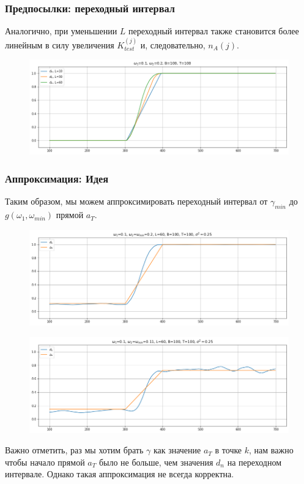 \documentclass[11pt]{beamer}
\begin{document}
	\begin{frame}
		\frametitle{Предпосылки: переходный интервал}
		Аналогично, при уменьшении $ L $ переходный интервал также становится более линейным в силу увеличения $ K_{test}^{(j)} $ и, следовательно, $ n_A(j) $.
		\begin{figure}[b]
			\centering
			\includegraphics[width=\linewidth]{imgs/row_linear_growth}
		\end{figure}
	\end{frame}
	
	\begin{frame}
		\frametitle{Аппроксимация: Идея}
		Таким образом, мы можем аппроксимировать переходный интервал от $ \gamma_{min} $ до $ g(\omega_1, \omega_{min}) $ прямой $ a_T $. 
		\begin{figure}[b]
			\centering
			\includegraphics[width=0.6\linewidth]{imgs/row_linear_approximation_1}
		\end{figure}
		
		\begin{figure}[b]
			\centering
			\includegraphics[width=0.6\linewidth]{imgs/row_linear_approximation_2}
		\end{figure}
		\small
		Важно отметить, раз мы хотим брать $ \gamma $ как значение $ a_T $ в точке $ k $, нам важно чтобы начало прямой $ a_T $ было не больше, чем значения $ d_n $ на переходном интервале. Однако такая аппроксимация не всегда корректна.
	\end{frame}
	
\end{document}

